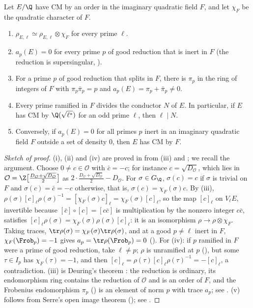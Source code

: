 \begin{theorem}\label{thm:ellcurves:cm-ap}
Let $E/\Q$ have CM by an order in the imaginary quadratic field $F$, and let $\chi_F$ be the quadratic character of $F$.
\begin{enumerate}[label=(\roman*)]
\item $\rho_{E,\ell}\simeq\rho_{E,\ell}\otimes\chi_F$ for every prime $\ell$.
\item $a_p(E)=0$ for every prime $p$ of good reduction that is inert in $F$ (the reduction is supersingular, ).
\item For a prime $p$ of good reduction that splits in $F$, there is $\pi_p$ in the ring of integers of $F$ with $\pi_p\bar\pi_p=p$ and $a_p(E)=\pi_p+\bar\pi_p\ne0$.
\item Every prime ramified in $F$ divides the conductor $N$ of $E$. In particular, if $E$ has CM by $\Q(\sqrt{\ell^*})$ for an odd prime $\ell$, then $\ell\mid N$.
\item Conversely, if $a_p(E)=0$ for all primes $p$ inert in an imaginary quadratic field $F$ outside a set of density $0$, then $E$ has CM by $F$.
\end{enumerate}
\end{theorem}

\begin{proof}[Sketch of proof]
(i), (ii) and (iv) are proved in  from (iii) and ; we recall the argument. Choose $0\ne c\in\mathcal O$ with
$\bar c=-c$; for instance $c=\sqrt{D_{\mathcal O}}$, which lies in $\mathcal O=\Z\bigl[\frac{D_{\mathcal O}+\sqrt{D_{\mathcal O}}}2\bigr]$ as $2\cdot\frac{D_{\mathcal O}+\sqrt{D_{\mathcal O}}}2-D_{\mathcal O}$.
For $\sigma\in G_\Q$, $\sigma(c)=c$ if $\sigma$ is trivial on $F$ and $\sigma(c)=\bar c=-c$ otherwise, that is, $\sigma(c)=\chi_F(\sigma)c$. By (iii),
$\rho(\sigma)[c]_\ell\rho(\sigma)^{-1}=[\chi_F(\sigma)c]_\ell=\chi_F(\sigma)[c]_\ell$, so the map $[c]_\ell$ on $V_\ell E$, invertible because $[\bar c]\circ[c]=[c\bar c]$ is multiplication by the nonzero
integer $c\bar c$, satisfies $[c]_\ell\rho(\sigma)=\chi_F(\sigma)\rho(\sigma)[c]_\ell$: it is an isomorphism $\rho\to\rho\otimes\chi_F$. Taking traces, $\tr\rho(\sigma)=\chi_F(\sigma)\tr\rho(\sigma)$, and at a good $p\ne\ell$ inert in $F$, $\chi_F(\Frob_p)=-1$ gives
$a_p=\tr\rho(\Frob_p)=0$ (). For (iv): if $p$ ramified in $F$ were a prime of good reduction, take $\ell\ne p$; $\rho$ is unramified at $p$
(), but some $\tau\in I_p$ has $\chi_F(\tau)=-1$, and then $[c]_\ell=\rho(\tau)[c]_\ell\rho(\tau)^{-1}=-[c]_\ell$, a contradiction. (iii) is Deuring's theorem
\cite{Deuring41}: the reduction is ordinary, its endomorphism ring contains the reduction of $\mathcal O$ and is an order of $F$, and the Frobenius endomorphism $\pi_p$
() is an element of norm $p$ with trace $a_p$; see \cite[Chapter II, Section 10]{SilvermanATAEC}. (v) follows from Serre's open image theorem
(); see \cite{SerreAbelian}.
\end{proof}

